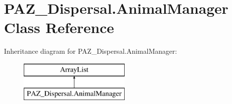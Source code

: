 \hypertarget{class_p_a_z___dispersal_1_1_animal_manager}{\section{P\-A\-Z\-\_\-\-Dispersal.\-Animal\-Manager Class Reference}
\label{class_p_a_z___dispersal_1_1_animal_manager}
}
Inheritance diagram for P\-A\-Z\-\_\-\-Dispersal.\-Animal\-Manager\-:\begin{figure}[H]
\begin{center}
\leavevmode
\includegraphics[height=2.000000cm]{class_p_a_z___dispersal_1_1_animal_manager}
\end{center}
\end{figure}

